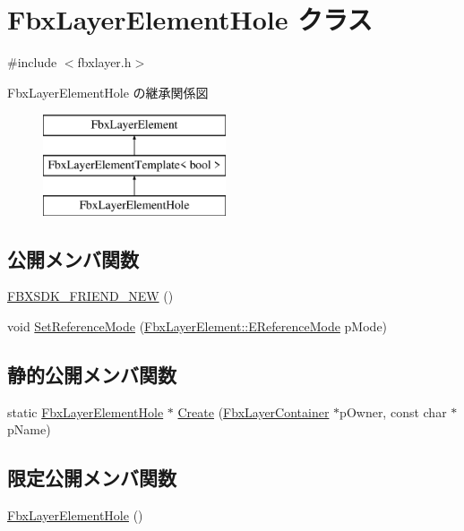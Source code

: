 \hypertarget{class_fbx_layer_element_hole}{}\section{Fbx\+Layer\+Element\+Hole クラス}
\label{class_fbx_layer_element_hole}


{\ttfamily \#include $<$fbxlayer.\+h$>$}

Fbx\+Layer\+Element\+Hole の継承関係図\begin{figure}[H]
\begin{center}
\leavevmode
\includegraphics[height=3.000000cm]{class_fbx_layer_element_hole}
\end{center}
\end{figure}
\subsection*{公開メンバ関数}
\begin{DoxyCompactItemize}
\item 
\hyperlink{class_fbx_layer_element_hole_a7180216993dbbb96cb3edbe3d2db5fa4}{F\+B\+X\+S\+D\+K\+\_\+\+F\+R\+I\+E\+N\+D\+\_\+\+N\+EW} ()
\item 
void \hyperlink{class_fbx_layer_element_hole_a496cc8811acb175197b76226f118149c}{Set\+Reference\+Mode} (\hyperlink{class_fbx_layer_element_a00f04654580ca9b2f5d292c11abd83fc}{Fbx\+Layer\+Element\+::\+E\+Reference\+Mode} p\+Mode)
\end{DoxyCompactItemize}
\subsection*{静的公開メンバ関数}
\begin{DoxyCompactItemize}
\item 
static \hyperlink{class_fbx_layer_element_hole}{Fbx\+Layer\+Element\+Hole} $\ast$ \hyperlink{class_fbx_layer_element_hole_ae2e9be9ff1db47440c55d72f00f4ef61}{Create} (\hyperlink{class_fbx_layer_container}{Fbx\+Layer\+Container} $\ast$p\+Owner, const char $\ast$p\+Name)
\end{DoxyCompactItemize}
\subsection*{限定公開メンバ関数}
\begin{DoxyCompactItemize}
\item 
\hyperlink{class_fbx_layer_element_hole_aa16cc2aabce4cbb8b03dd1206778a30f}{Fbx\+Layer\+Element\+Hole} ()
\end{DoxyCompactItemize}
